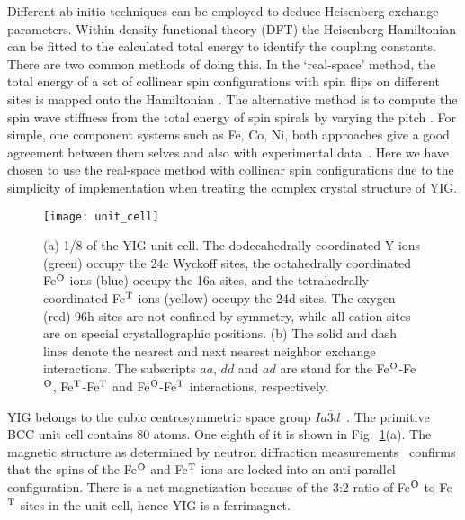 \documentclass[aps,pre,reprint,superscriptaddress,longbibliography]{revtex4-1}
\begin{document}
Different ab initio techniques can be employed to deduce Heisenberg exchange parameters. Within density functional theory (DFT) the Heisenberg Hamiltonian can be fitted to the calculated total energy to identify the coupling constants. There are two common methods of doing this. In the `real-space' method, the total energy of a set of collinear spin configurations with spin flips on different sites is mapped onto the Hamiltonian \cite{Wang2008,Gao2013}. The alternative method is to compute the spin wave stiffness  from the total energy of spin spirals by varying the pitch \cite{Essenberger2011}. For simple, one component systems such as Fe, Co, Ni, both approaches give a good agreement between them selves and also with experimental data~\cite{Halilov1998,Pajda2001}. Here we have chosen to use the real-space method with collinear spin configurations due to the  simplicity of implementation when treating the complex crystal structure of YIG.

\begin{figure}
                \centering

\texttt{[image: unit\_cell]}        
        
        \caption{(a) 1/8 of the YIG unit cell. The dodecahedrally coordinated
Y ions (green) occupy the 24c Wyckoff sites, the octahedrally
coordinated Fe$^{\rm O}$ ions (blue) occupy the 16a sites, and the
tetrahedrally coordinated Fe$^{\rm T}$ ions (yellow) occupy the
24d sites. The oxygen (red) 96h sites are not confined by symmetry,
while all cation sites are on special crystallographic positions. (b) The solid and dash lines denote
the nearest and next nearest neighbor exchange interactions. The subscripts $aa$, $dd$ and
$ad$ are stand for the Fe$^{\rm O}$-Fe$^{\rm O}$, Fe$^{\rm T}$-Fe$^{\rm T}$
and Fe$^{\rm O}$-Fe$^{\rm T}$ interactions, respectively. \label{fig1}}
\end{figure}

YIG belongs to the cubic centrosymmetric space group $Ia\overline{3}d$~\cite{Geller1957,Geller1959}. The primitive BCC unit cell contains 80 atoms. One eighth of it is shown in Fig.~\ref{fig1}(a). The magnetic structure as determined by neutron diffraction measurements~\cite{Bertaut1956} confirms that the spins of the Fe$^{\rm O}$ and Fe$^{\rm T}$ ions are locked into an anti-parallel configuration. There is a net magnetization because of the 3:2 ratio of Fe$^{\rm O}$ to Fe$^{\rm T}$ sites in the unit cell, hence YIG is a ferrimagnet.
\end{document}
